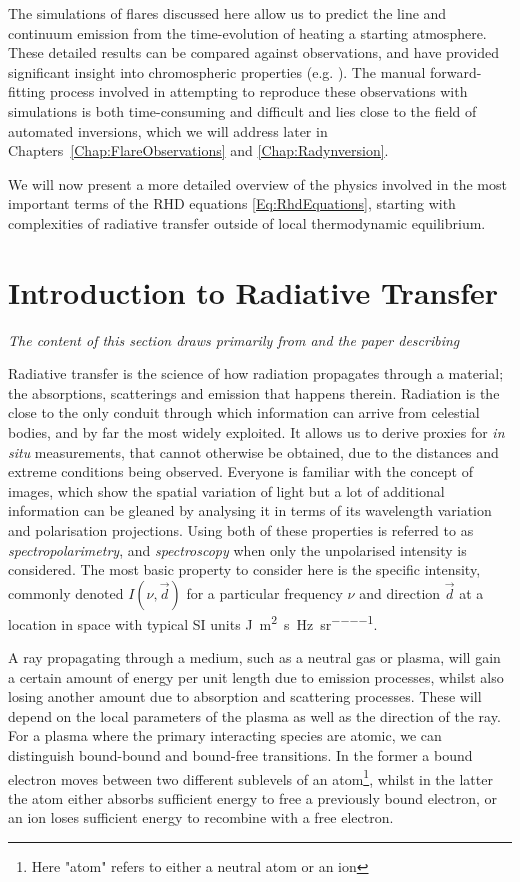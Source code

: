 The simulations of flares discussed here allow us to predict the line and continuum emission from the time-evolution of heating a starting atmosphere.
These detailed results can be compared against observations, and have provided significant insight into chromospheric properties (e.g. \citet{Kuridze2015,RubioDaCosta2016,Kowalski2017,Simoes2017}).
The manual forward-fitting process involved in attempting to reproduce these observations with simulations is both time-consuming and difficult and lies close to the field of automated inversions, which we will address later in Chapters~\ref{Chap:FlareObservations} and \ref{Chap:Radynversion}.

We will now present a more detailed overview of the physics involved in the most important terms of the RHD equations \eqref{Eq:RhdEquations}, starting with complexities of radiative transfer outside of local thermodynamic equilibrium.

\section{Introduction to Radiative Transfer}\label{Sec:IntroRT}

\emph{The content of this section draws primarily from \citet{Hubeny2014} and the paper describing \Lw{} \citep{Osborne2021}}

Radiative transfer is the science of how radiation propagates through a material; the absorptions, scatterings and emission that happens therein.
Radiation is the close to the only conduit through which information can arrive from celestial bodies, and by far the most widely exploited.
It allows us to derive proxies for \emph{in situ} measurements, that cannot otherwise be obtained, due to the distances and extreme conditions being observed.
Everyone is familiar with the concept of images, which show the spatial variation of light but a lot of additional information can be gleaned by analysing it in terms of its wavelength variation and polarisation projections.
Using both of these properties is referred to as \emph{spectropolarimetry}, and \emph{spectroscopy} when only the unpolarised intensity is considered.
The most basic property to consider here is the specific intensity, commonly denoted $I(\nu, \vec{d})$ for a particular frequency $\nu$ and direction $\vec{d}$ at a location in space with typical SI units \si{\joule\per\square\metre\per\s\per\hertz\per\steradian}.

A ray propagating through a medium, such as a neutral gas or plasma, will gain a certain amount of energy per unit length due to emission processes, whilst also losing another amount due to absorption and scattering processes. These will depend on the local parameters of the plasma as well as the direction of the ray. For a plasma where the primary interacting species are atomic, we can distinguish bound-bound and bound-free transitions. In the former a bound electron moves between two different sublevels of an atom\footnote{Here "atom" refers to either a neutral atom or an ion}, whilst in the latter the atom either absorbs sufficient energy to free a previously bound electron, or an ion loses sufficient energy to recombine with a free electron.

